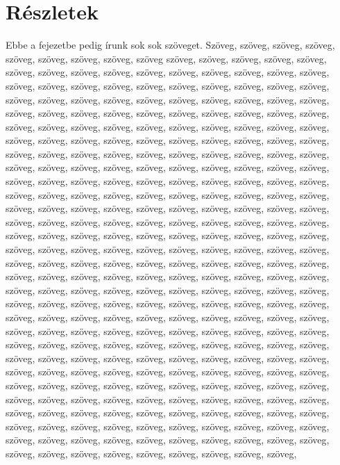 \documentclass[12pt]{report}
\theoremstyle{definition}
\begin{document}
\section{Részletek}
Ebbe a fejezetbe pedig írunk sok sok szöveget. Szöveg, szöveg, szöveg,  szöveg, szöveg, szöveg,   szöveg, szöveg, szöveg
szöveg, szöveg, szöveg,  szöveg, szöveg, szöveg, szöveg, szöveg, szöveg, szöveg, szöveg, szöveg, szöveg, szöveg, szöveg,
szöveg, szöveg, szöveg, szöveg, szöveg, szöveg, szöveg, szöveg, szöveg, szöveg, szöveg, szöveg, szöveg, szöveg, szöveg,
szöveg, szöveg, szöveg, szöveg, szöveg, szöveg, szöveg, szöveg, szöveg, szöveg, szöveg, szöveg,
szöveg, szöveg, szöveg, szöveg, szöveg, szöveg, szöveg, szöveg, szöveg, szöveg, szöveg, szöveg, szöveg, szöveg, szöveg,
szöveg, szöveg, szöveg, szöveg, szöveg, szöveg, szöveg, szöveg, szöveg, szöveg, szöveg, szöveg, szöveg, szöveg, szöveg,
szöveg, szöveg, szöveg, szöveg, szöveg, szöveg, szöveg, szöveg, szöveg, szöveg, szöveg, szöveg, szöveg, szöveg, szöveg,
szöveg, szöveg, szöveg, szöveg, szöveg, szöveg, szöveg, szöveg, szöveg, szöveg, szöveg, szöveg, szöveg, szöveg, szöveg,
szöveg, szöveg, szöveg, szöveg, szöveg, szöveg, szöveg, szöveg, szöveg, szöveg, szöveg, szöveg, szöveg, szöveg, szöveg,
szöveg, szöveg, szöveg, szöveg, szöveg, szöveg, szöveg, szöveg, szöveg, szöveg, szöveg, szöveg, szöveg, szöveg, szöveg,
szöveg, szöveg, szöveg, szöveg, szöveg, szöveg, szöveg, szöveg, szöveg, szöveg, szöveg, szöveg, szöveg, szöveg, szöveg,
szöveg, szöveg, szöveg,  szöveg, szöveg, szöveg, szöveg, szöveg, szöveg, szöveg, szöveg, szöveg, szöveg, szöveg, szöveg,
szöveg, szöveg, szöveg, szöveg, szöveg, szöveg, szöveg, szöveg, szöveg, szöveg, szöveg, szöveg, szöveg, szöveg, szöveg,
szöveg, szöveg, szöveg, szöveg, szöveg, szöveg, szöveg, szöveg, szöveg, szöveg, szöveg, szöveg,
szöveg, szöveg, szöveg, szöveg, szöveg, szöveg, szöveg, szöveg, szöveg, szöveg, szöveg, szöveg, szöveg, szöveg, szöveg,
szöveg, szöveg, szöveg, szöveg, szöveg, szöveg, szöveg, szöveg, szöveg, szöveg, szöveg, szöveg, szöveg, szöveg, szöveg,
szöveg, szöveg, szöveg, szöveg, szöveg, szöveg, szöveg, szöveg, szöveg, szöveg, szöveg, szöveg, szöveg, szöveg, szöveg,
szöveg, szöveg, szöveg, szöveg, szöveg, szöveg, szöveg, szöveg, szöveg, szöveg, szöveg, szöveg, szöveg, szöveg, szöveg,
szöveg, szöveg, szöveg, szöveg, szöveg, szöveg, szöveg, szöveg, szöveg, szöveg, szöveg, szöveg, szöveg, szöveg, szöveg,
szöveg, szöveg, szöveg, szöveg, szöveg, szöveg, szöveg, szöveg, szöveg, szöveg, szöveg, szöveg, szöveg, szöveg, szöveg,
szöveg, szöveg, szöveg, szöveg, szöveg, szöveg, szöveg, szöveg, szöveg, szöveg, szöveg, szöveg, szöveg, szöveg, szöveg,
\end{document}
